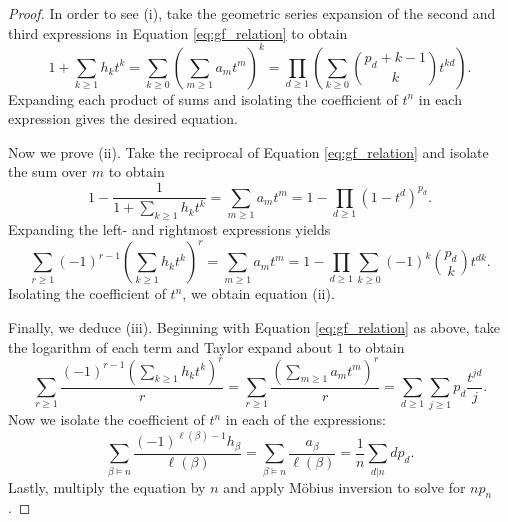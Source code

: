 \documentclass[11pt]{amsart}
\theoremstyle{definition}
\numberwithin{equation}{section}
\begin{document}
\begin{proof}

In order to see (i), take the geometric series expansion of the second and third expressions in Equation \eqref{eq:gf_relation} to obtain
\begin{equation}\label{eq:gf_relation_reciprocal}
1 + \sum_{k \geq 1} h_k t^k
= \sum_{k \geq 0} \left(\sum_{m \geq 1} a_m t^m\right)^k
= \prod_{d \geq 1} \left(\sum_{k \geq 0} \binom{p_d+k-1}{k} t^{kd}\right).
\end{equation}
Expanding each product of sums and isolating the coefficient of $t^{n}$ in each expression gives the desired equation.

Now we prove (ii).  Take the reciprocal of Equation \eqref{eq:gf_relation}
and isolate the sum over $m$ to obtain
\[
1 - \frac{1}{1 + \sum_{k \geq 1} h_k t^k} 
= \sum_{m \geq 1} a_m t^m 
= 1 - \prod_{d \geq 1} (1-t^d)^{p_d}.
\]
Expanding the left- and rightmost expressions yields
\[
\sum_{r \geq 1} (-1)^{r-1} \left(\sum_{k \geq 1} h_k t^k\right)^r
= \sum_{m \geq 1} a_m t^m
= 1 - \prod_{d \geq 1} \sum_{k \geq 0} (-1)^k \binom{p_d}{k} t^{dk}.
\]
Isolating the coefficient of $t^{n}$, we obtain equation (ii).

Finally, we deduce (iii).  Beginning with Equation \eqref{eq:gf_relation} as above,
take the logarithm of each term and Taylor expand about $1$ to obtain
%
\[
 \sum_{r \geq 1} \frac{(-1)^{r-1}(\sum_{k \geq 1} h_k t^k )^r}{r}
= \sum_{r \geq 1} \frac{(\sum_{m \geq 1} a_m t^m )^r}{r}
= \sum_{d \geq 1} \sum_{j \geq 1} p_d \frac{t^{jd}}{j}.
\]
Now we isolate the coefficient of $t^{n}$ in each of the expressions: 
\[
\sum_{\beta \vDash n} \frac{(-1)^{\ell(\beta)-1} h_\beta}{\ell(\beta)}
= \sum_{\beta \vDash n} \frac{a_\beta}{\ell(\beta)}
= \frac{1}{n} \sum_{d | n} d p_{d} .
\]
Lastly, multiply the equation by $n$ and apply M\"{o}bius inversion to solve for $n p_{n}$.
\end{proof}
\end{document}
